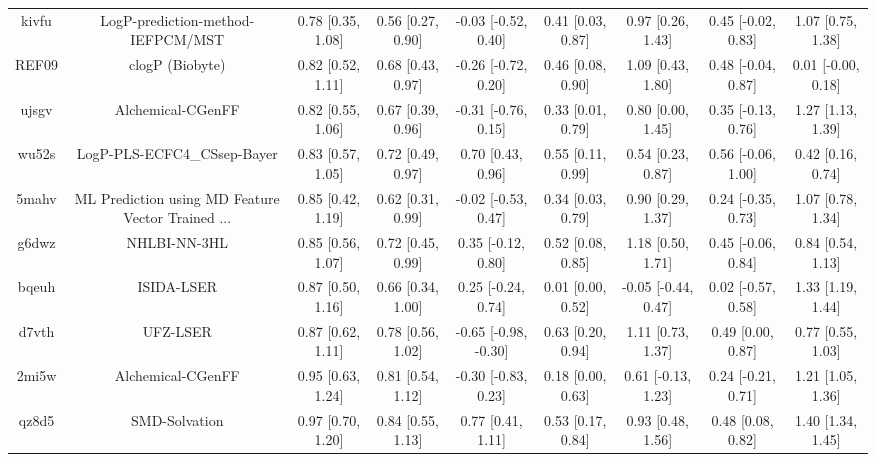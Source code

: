 \documentclass{article}
\begin{document}
\begin{center}
\begin{longtable}{|ccccccccc|}
 kivfu &                  LogP-prediction-method-IEFPCM/MST &  0.78 [0.35, 1.08] &  0.56 [0.27, 0.90] &   -0.03 [-0.52, 0.40] &  0.41 [0.03, 0.87] &    0.97 [0.26, 1.43] &   0.45 [-0.02, 0.83] &     1.07 [0.75, 1.38] \\
 REF09 &                                    clogP (Biobyte) &  0.82 [0.52, 1.11] &  0.68 [0.43, 0.97] &   -0.26 [-0.72, 0.20] &  0.46 [0.08, 0.90] &    1.09 [0.43, 1.80] &   0.48 [-0.04, 0.87] &    0.01 [-0.00, 0.18] \\
 ujsgv &                                  Alchemical-CGenFF &  0.82 [0.55, 1.06] &  0.67 [0.39, 0.96] &   -0.31 [-0.76, 0.15] &  0.33 [0.01, 0.79] &    0.80 [0.00, 1.45] &   0.35 [-0.13, 0.76] &     1.27 [1.13, 1.39] \\
 wu52s &                        LogP-PLS-ECFC4\_CSsep-Bayer &  0.83 [0.57, 1.05] &  0.72 [0.49, 0.97] &     0.70 [0.43, 0.96] &  0.55 [0.11, 0.99] &    0.54 [0.23, 0.87] &   0.56 [-0.06, 1.00] &     0.42 [0.16, 0.74] \\
 5mahv &  ML Prediction using MD Feature Vector Trained ... &  0.85 [0.42, 1.19] &  0.62 [0.31, 0.99] &   -0.02 [-0.53, 0.47] &  0.34 [0.03, 0.79] &    0.90 [0.29, 1.37] &   0.24 [-0.35, 0.73] &     1.07 [0.78, 1.34] \\
 g6dwz &                                       NHLBI-NN-3HL &  0.85 [0.56, 1.07] &  0.72 [0.45, 0.99] &    0.35 [-0.12, 0.80] &  0.52 [0.08, 0.85] &    1.18 [0.50, 1.71] &   0.45 [-0.06, 0.84] &     0.84 [0.54, 1.13] \\
 bqeuh &                                         ISIDA-LSER &  0.87 [0.50, 1.16] &  0.66 [0.34, 1.00] &    0.25 [-0.24, 0.74] &  0.01 [0.00, 0.52] &  -0.05 [-0.44, 0.47] &   0.02 [-0.57, 0.58] &     1.33 [1.19, 1.44] \\
 d7vth &                                           UFZ-LSER &  0.87 [0.62, 1.11] &  0.78 [0.56, 1.02] &  -0.65 [-0.98, -0.30] &  0.63 [0.20, 0.94] &    1.11 [0.73, 1.37] &    0.49 [0.00, 0.87] &     0.77 [0.55, 1.03] \\
 2mi5w &                                  Alchemical-CGenFF &  0.95 [0.63, 1.24] &  0.81 [0.54, 1.12] &   -0.30 [-0.83, 0.23] &  0.18 [0.00, 0.63] &   0.61 [-0.13, 1.23] &   0.24 [-0.21, 0.71] &     1.21 [1.05, 1.36] \\
 qz8d5 &                                      SMD-Solvation &  0.97 [0.70, 1.20] &  0.84 [0.55, 1.13] &     0.77 [0.41, 1.11] &  0.53 [0.17, 0.84] &    0.93 [0.48, 1.56] &    0.48 [0.08, 0.82] &     1.40 [1.34, 1.45] \\

\end{longtable}
\end{center}
\end{document}
